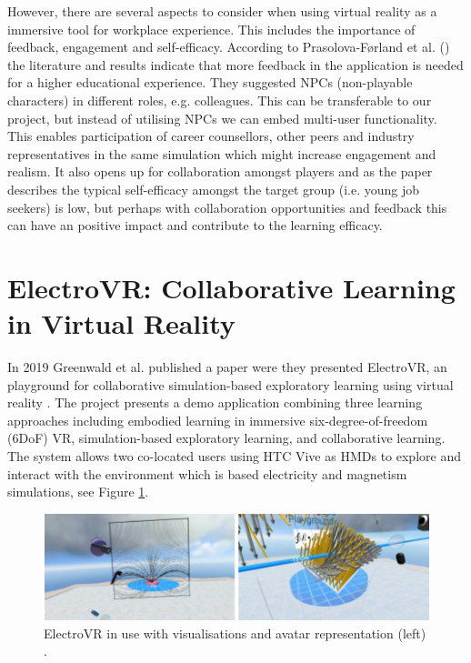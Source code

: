 However, there are several aspects to consider when using virtual reality as a immersive tool for workplace experience. This includes the importance of feedback, engagement and self-efficacy. According to Prasolova-Førland et al. (\citeyear{prasolova2019empowering}) the literature and results indicate that more feedback in the application is needed for a higher educational experience. They suggested NPCs (non-playable characters) in different roles, e.g. colleagues. This can be transferable to our project, but instead of utilising NPCs we can embed multi-user functionality. This enables participation of career counsellors, other peers and industry representatives in the same simulation which might increase engagement and realism. It also opens up for collaboration amongst players and as the paper describes the typical self-efficacy amongst the target group (i.e. young job seekers) is low, but perhaps with collaboration opportunities and feedback this can have an positive impact and contribute to the learning efficacy.  



\section{ElectroVR: Collaborative Learning in Virtual Reality}
\label{section:electroVR}
In 2019 Greenwald et al. published a paper were they presented ElectroVR, an playground for collaborative simulation-based exploratory learning using virtual reality \cite{greenwald2019electrovr}. The project presents a demo application combining three learning approaches including embodied learning in immersive six-degree-of-freedom (6DoF)  VR,  simulation-based  exploratory  learning,  and collaborative learning. The system allows two co-located users using HTC Vive as HMDs to explore and interact with the environment which is based electricity and  magnetism simulations, see Figure \ref{fig:electroVR}.

 \begin{figure}[!ht]
     \centering
     \includegraphics[width=.9\textwidth]{./fig/related_work/electroVR.PNG}
     \caption{ElectroVR in use with visualisations and avatar representation (left) \cite{greenwald2019electrovr}. }
     \label{fig:electroVR}
 \end{figure}
 
